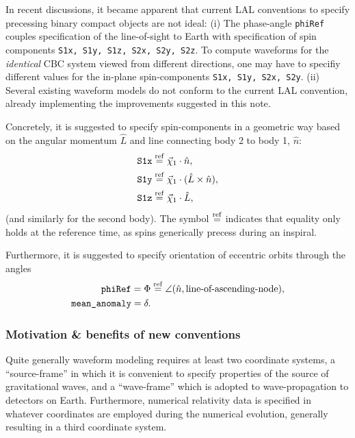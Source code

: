 \documentclass[11pt,tightenlines,article,amssymb,amsmath,amsfonts,superscriptaddress]{revtex4}
\newcommand{\nNR}{\hat{n}}
\newcommand{\lNR}{\hat L}
\newcommand{\phiRef}{\Phi} %
\newcommand{\equalref}{\overset{\rm ref}{=}}
\begin{document}
In recent discussions, it became apparent that current LAL conventions
to specify precessing binary compact objects are not ideal: (i) The
phase-angle {\tt phiRef} couples specification of the line-of-sight to
Earth with specification of spin components {\tt S1x, S1y, S1z, S2x,
  S2y, S2z}.  To compute waveforms for the \emph{identical} CBC system
viewed from different directions, one may have to specifiy different
values for the in-plane spin-components {\tt S1x, S1y, S2x, S2y}.
(ii) Several existing waveform models do not conform to the current
LAL convention, already implementing the improvements suggested in this note.

Concretely, it is suggested to specify spin-components in a geometric
way based on the angular momentum $\lNR$ and line connecting body 2 to
body 1, $\nNR$:
\begin{align}
  \mbox{\tt S1x}&\equalref \vec\chi_1\cdot\nNR,\\
  \mbox{\tt S1y}&\equalref \vec\chi_1\cdot (\lNR\times\nNR),\\
  \mbox{\tt S1z}&\equalref \vec\chi_1\cdot\lNR,
\end{align}
(and similarly for the second body).  The symbol $\equalref$ indicates
that equality only holds at the reference time, as spins generically
precess during an inspiral.

Furthermore, it is suggested to specify
orientation of eccentric orbits through the angles
\begin{align}
  \mbox{\tt phiRef} = \phiRef &\equalref \angle(\nNR, \mbox{line-of-ascending-node}),\\
  \mbox{\tt mean\_anomaly}= \delta.& %
  \end{align}


\subsubsection{Motivation \& benefits of new conventions}

Quite generally waveform modeling requires at least two coordinate
systems, a ``source-frame'' in which it is convenient to specify
properties of the source of gravitational waves, and a ``wave-frame''
which is adopted to wave-propagation to detectors on Earth.
Furthermore, numerical relativity data is specified in whatever
coordinates are employed during the numerical evolution, generally
resulting in a third coordinate system.
\end{document}
